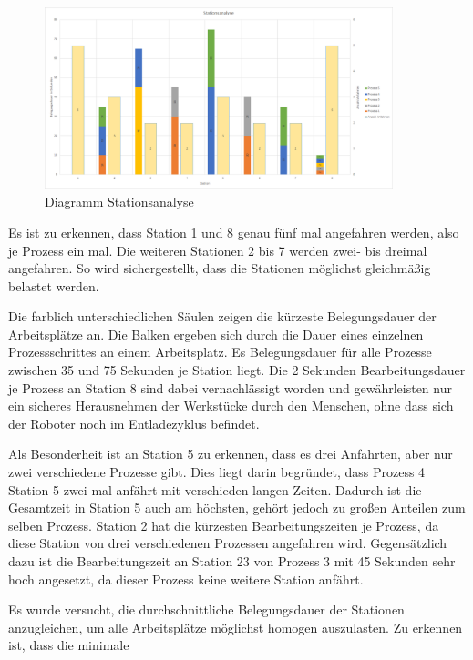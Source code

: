 \begin{figure}[htb]
    \centering
    \includegraphics[width=0.9\textwidth]{Abbildungen/Stationsanalyse.PNG}
    \caption{Diagramm Stationsanalyse}		
    \label{fig:Stationsanalyse}
\end{figure}

Es ist zu erkennen, dass Station 1 und 8 genau fünf mal angefahren werden, also je Prozess ein mal. Die weiteren Stationen 2 bis 7 werden zwei- bis dreimal angefahren. So wird sichergestellt, dass die Stationen möglichst gleichmäßig belastet werden. 

Die farblich unterschiedlichen Säulen zeigen die kürzeste Belegungsdauer der Arbeitsplätze an. Die Balken ergeben sich durch die Dauer eines einzelnen Prozessschrittes an einem Arbeitsplatz. Es  Belegungsdauer für alle Prozesse zwischen 35 und 75 Sekunden je Station liegt. Die 2 Sekunden Bearbeitungsdauer je Prozess an Station 8 sind dabei vernachlässigt worden und gewährleisten nur ein sicheres Herausnehmen der Werkstücke durch den Menschen, ohne dass sich der Roboter noch im Entladezyklus befindet. 

Als Besonderheit ist an Station 5 zu erkennen, dass es drei Anfahrten, aber nur zwei verschiedene Prozesse gibt. Dies liegt darin begründet, dass Prozess 4 Station 5 zwei mal anfährt mit verschieden langen Zeiten. Dadurch ist die Gesamtzeit in Station 5 auch am höchsten, gehört jedoch zu großen Anteilen zum selben Prozess. Station 2 hat die kürzesten Bearbeitungszeiten je Prozess, da diese Station von drei verschiedenen Prozessen angefahren wird. Gegensätzlich dazu ist die Bearbeitungszeit an Station 23 von Prozess 3 mit 45 Sekunden sehr hoch angesetzt, da dieser Prozess keine weitere Station anfährt. 

Es wurde versucht, die durchschnittliche Belegungsdauer der Stationen anzugleichen, um alle Arbeitsplätze möglichst homogen auszulasten. Zu erkennen ist, dass die minimale

